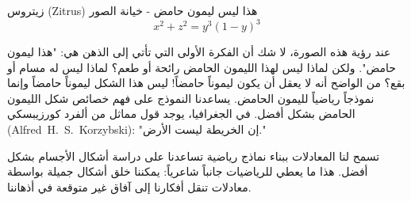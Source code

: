 \begin{surferPage}{زيتروس (Zitrus)}
هذا ليس ليمون حامض - خيانة الصور\\
\smallskip
\[x^2 + z^2 = y^3 (1 - y)^3\] 


\singlespacing
عند رؤية هذه الصورة، لا شك أن الفكرة الأولى التي تأتي إلى الذهن هي: "هذا ليمون حامض". ولكن لماذا ليس لهذا الليمون الحامض رائحة أو طعم؟ لماذا ليس له مسام أو بقع؟ من الواضح أنه لا يعقل أن يكون ليموناً حامضاً! 
\singlespacing
ليس هذا الشكل ليموناً حامضاً وإنما نموذجاً رياضياً لليمون الحامض. يساعدنا النموذج على فهم خصائص شكل الليمون الحامض بشكل أفضل. في الجغرافيا، يوجد قول مماثل من ألفرد كورزيبسكي (Alfred\ H.\ S.\ Korzybski): "إن الخريطة ليست الأرض." \\
\singlespacing

تسمح لنا المعادلات ببناء نماذج رياضية تساعدنا على دراسة أشكال الأجسام بشكل أفضل.
\singlespacing
هذا ما يعطي للرياضيات جانباً شاعرياً: يمكننا خلق أشكال جميلة بواسطة معادلات تنقل أفكارنا إلى آفاق غير متوقعة في أذهاننا.
\end{surferPage}

